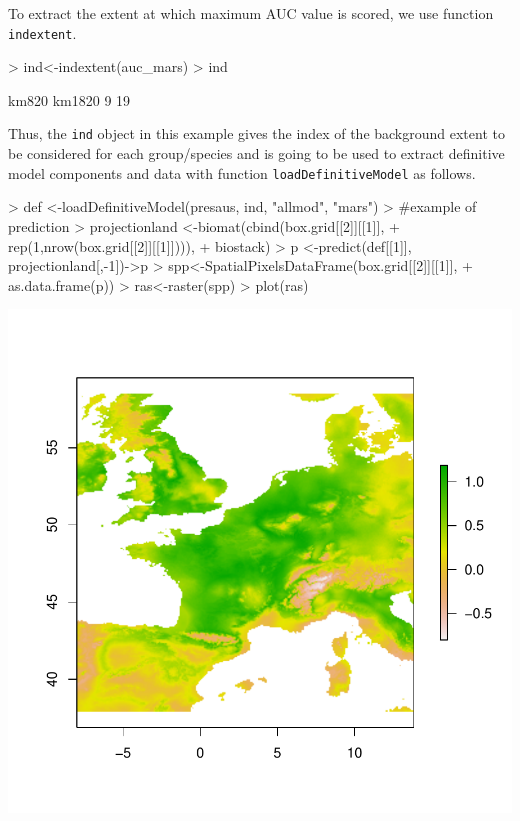 \documentclass[10pt,a4paper]{report}
\begin{document}
To extract the extent at which maximum AUC value is scored, we use function \texttt{indextent}.

\begin{Schunk}
\begin{Sinput}
> ind<-indextent(auc_mars)
> ind
\end{Sinput}
\begin{Soutput}
 km820 km1820 
     9     19 
\end{Soutput}
\end{Schunk}

Thus, the \texttt{ind} object in this example gives the index of the background extent to be considered for each group/species and is going to be used to extract definitive model components and data with function \texttt{loadDefinitiveModel} as follows. 

\begin{Schunk}
\begin{Sinput}
> def <-loadDefinitiveModel(presaus, ind, "allmod", "mars")
> #example of prediction
> projectionland <-biomat(cbind(box.grid[[2]][[1]], 
+                     rep(1,nrow(box.grid[[2]][[1]]))), 
+                     biostack)
> p <-predict(def[[1]], projectionland[,-1])->p
> spp<-SpatialPixelsDataFrame(box.grid[[2]][[1]], 
+                             as.data.frame(p))
> ras<-raster(spp)
> plot(ras)
\end{Sinput}
\end{Schunk}
\includegraphics{mopa-mopa15}






\end{document}
